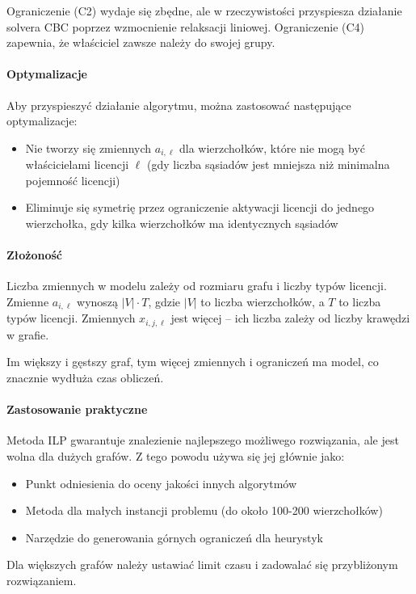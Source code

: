 \noindent Ograniczenie (C2) wydaje się zbędne, ale w rzeczywistości przyspiesza działanie solvera CBC poprzez wzmocnienie relaksacji liniowej. Ograniczenie (C4) zapewnia, że właściciel zawsze należy do swojej grupy.

\paragraph{Optymalizacje}
Aby przyspieszyć działanie algorytmu, można zastosować następujące optymalizacje:
\begin{itemize}
  \item Nie tworzy się zmiennych $a_{i,\ell}$ dla wierzchołków, które nie mogą być właścicielami licencji $\ell$ (gdy liczba sąsiadów jest mniejsza niż minimalna pojemność licencji)
  \item Eliminuje się symetrię przez ograniczenie aktywacji licencji do jednego wierzchołka, gdy kilka wierzchołków ma identycznych sąsiadów
\end{itemize}

\paragraph{Złożoność}
Liczba zmiennych w modelu zależy od rozmiaru grafu i liczby typów licencji. Zmienne $a_{i,\ell}$ wynoszą $|V| \cdot T$, gdzie $|V|$ to liczba wierzchołków, a $T$ to liczba typów licencji. Zmiennych $x_{i,j,\ell}$ jest więcej -- ich liczba zależy od liczby krawędzi w grafie.

Im większy i gęstszy graf, tym więcej zmiennych i ograniczeń ma model, co znacznie wydłuża czas obliczeń.

\paragraph{Zastosowanie praktyczne}
Metoda ILP gwarantuje znalezienie najlepszego możliwego rozwiązania, ale jest wolna dla dużych grafów. Z tego powodu używa się jej głównie jako:
\begin{itemize}
  \item Punkt odniesienia do oceny jakości innych algorytmów
  \item Metoda dla małych instancji problemu (do około 100-200 wierzchołków)
  \item Narzędzie do generowania górnych ograniczeń dla heurystyk
\end{itemize}
Dla większych grafów należy ustawiać limit czasu i zadowalać się przybliżonym rozwiązaniem.


